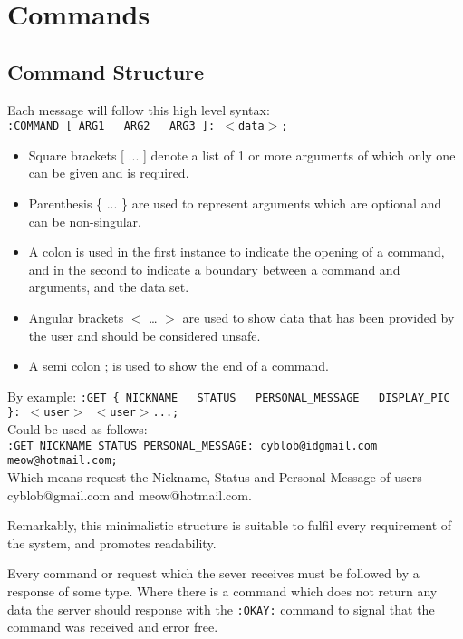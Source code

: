 \section{Commands}

\subsection*{Command Structure}

Each message will follow this high level syntax: \\
\texttt{:COMMAND [ ARG1 \ \vline \ ARG2 \ \vline \ ARG3 ]: $<$data$>$;} \\

\begin{itemize}

\item{Square brackets [ ... ] denote a list of 1 or more arguments of which only one can be given and is required.}  

\item{Parenthesis \{ ... \} are used to represent arguments which are optional and can be non-singular.}

\item{A colon is used in the first instance to indicate the opening of a command, and in the second to indicate a boundary between a command and arguments, and the data set.}

\item{Angular brackets $<$ … $>$ are used to show data that has been provided by the user and should be considered unsafe.}

\item{A semi colon ; is used to show the end of a command.}

\end{itemize}

By example:
\texttt{:GET \{ NICKNAME \ \vline \ STATUS \ \vline \ PERSONAL\_MESSAGE \ \vline \ DISPLAY\_PIC \}: $<$user$>$ $<$user$>$...;}\\
Could be used as follows: \\
\texttt{:GET NICKNAME STATUS PERSONAL\_MESSAGE: cyblob@idgmail.com meow@hotmail.com;} \\
Which means request the Nickname, Status and Personal Message of users cyblob@gmail.com and meow@hotmail.com.

Remarkably, this minimalistic structure is suitable to fulfil every requirement of the system, and promotes readability.

Every command or request which the sever receives must be followed by a response of some type. Where there is a command which does not return any data the server should response with the \texttt{:OKAY:} command to signal that the command was received and error free.


